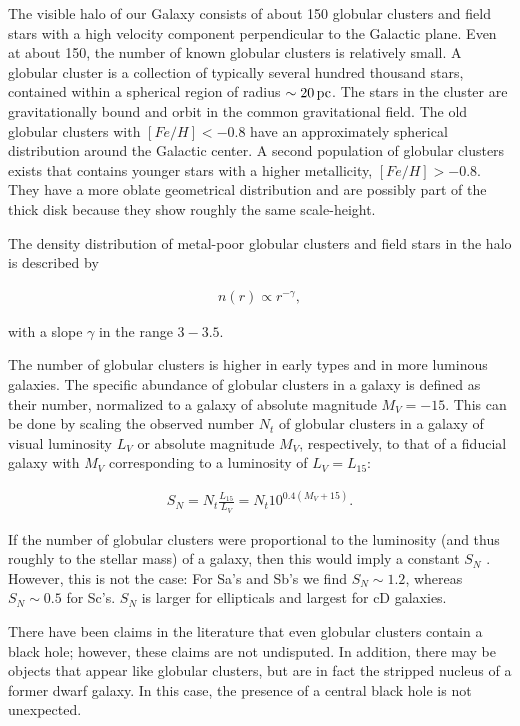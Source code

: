 \documentclass[a4paper,11pt]{article}
\begin{document}
{\noindent}The visible halo of our Galaxy consists of about 150 globular clusters and field stars with a high velocity component perpendicular to the Galactic plane. Even at about 150, the number of known globular clusters is relatively small. A globular cluster is a collection of typically several hundred thousand stars, contained within a spherical region of radius   $\sim20\,{\rm pc}$. The stars in the cluster are gravitationally bound and orbit in the common gravitational field. The old globular clusters with $[Fe/H]<-0.8$ have an approximately spherical distribution around the Galactic center. A second population of globular clusters exists that contains younger stars with a higher metallicity, $[Fe/H]>-0.8$. They have a more oblate geometrical distribution and are possibly part of the thick disk because they show roughly the same scale-height.

{\noindent}The density distribution of metal-poor globular clusters and field stars in the halo is described by

\begin{align*}
    n(r)\propto r^{-\gamma},
\end{align*}

{\noindent}with a slope $\gamma$ in the range $3-3.5$.

{\noindent}The number of globular clusters is higher in early types and in more luminous galaxies. The specific abundance of globular clusters in a galaxy is defined as their number, normalized to a galaxy of absolute magnitude $M_V=-15$. This can be done by scaling the observed number $N_t$ of globular clusters in a galaxy of visual luminosity $L_V$ or absolute magnitude $M_V$, respectively, to that of a fiducial galaxy with $M_V$ corresponding to a luminosity of $L_V=L_{15}$:

\begin{align*}
    S_N = N_t\frac{L_{15}}{L_V} = N_t10^{0.4(M_V+15)}.
\end{align*}

{\noindent}If the number of globular clusters were proportional to the luminosity (and thus roughly to the stellar mass) of a galaxy, then this would imply a constant $S_N$ . However, this is not the case: For Sa's and Sb's we find $S_N\sim1.2$, whereas $S_N\sim0.5$ for Sc's. $S_N$ is larger for ellipticals and largest for cD galaxies.

{\noindent}There have been claims in the literature that even globular clusters contain a black hole; however, these claims are not undisputed. In addition, there may be objects that appear like globular clusters, but are in fact the stripped nucleus of a former dwarf galaxy. In this case, the presence of a central black hole is not unexpected.
\end{document}
